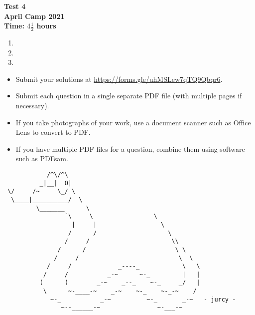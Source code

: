 \documentclass{article}
\begin{document}
\thispagestyle{empty}

\begin{center}
  \textbf{\Large Test 4}
  \\ \vspace{1em}
  \textbf{\large April Camp 2021}
  \\ \vspace{1em}
  \textbf{\large Time: $4\frac{1}{2}$ hours}
\end{center}

\vspace{24pt}

\begin{enumerate}[itemsep=18pt]

\item


\item


\item

\end{enumerate}


\vfill
\begin{itemize}
	\item Submit your solutions at \url{https://forms.gle/uhMSLew7qTQ9Qbqr6}.
	\item Submit each question in a single separate PDF file (with multiple pages if necessary).
	\item If you take photographs of your work, use a document scanner such as Office Lens to convert to PDF.
	\item If you have multiple PDF files for a question, combine them using software such as PDFsam.
\end{itemize}

\vfill
\centering
\begin{BVerbatim}
            /^\/^\
          _|__|  O|
 \/     /~     \_/ \
  \____|__________/  \
         \_______      \
                 `\     \                 \
                   |     |                  \
                  /      /                    \
                 /     /                       \\
               /      /                         \ \
              /     /                            \  \
            /     /             _----_            \   \
           /     /           _-~      ~-_         |   |
          (      (        _-~    _--_    ~-_     _/   |
           \      ~-____-~    _-~    ~-_    ~-_-~    /
             ~-_           _-~          ~-_       _-~   - jurcy -
                ~--______-~                ~-___-~
\end{BVerbatim}
\end{document}

